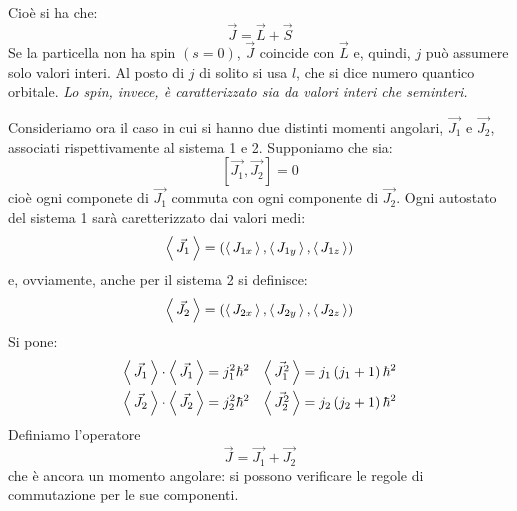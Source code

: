Cioè si ha che: 
\begin{equation}
\vec{J} = \vec{L} + \vec{S}
\end{equation}
Se la particella non ha spin $\left( s = 0\right)$, $\vec{J}$ coincide con
$\vec{L}$ e, quindi, $j$ può assumere solo valori interi. Al posto di $j$ di
solito si usa $l$, che si dice numero quantico orbitale. \textit{Lo spin,
invece, è caratterizzato sia da valori interi che seminteri.}

Consideriamo ora il caso in cui si hanno due distinti momenti angolari,
$\vec{J_{1}}$ e $\vec{J_{2}}$, associati rispettivamente al sistema 1 e 2.
Supponiamo che sia:
\begin{equation}
\left[\vec{J_{1}}, \vec{J_{2}} \right] = 0
\end{equation}
cioè ogni componete di $\vec{J_{1}}$ commuta con ogni componente di
$\vec{J_{2}}$. Ogni autostato del sistema 1 sarà caretterizzato dai valori 
medi:
\begin{equation}
\left\langle\, \vec{J_{1}} \,\right\rangle = \left( \left\langle\, J_{1x} \,\right\rangle, \left\langle\, J_{1y} \,\right\rangle, \left\langle\, J_{1z} \,\right\rangle \right)
\end{equation}
e, ovviamente, anche per il sistema 2 si definisce:
\begin{equation}
\left\langle\, \vec{J_{2}} \,\right\rangle = \left( \left\langle\, J_{2x} \,\right\rangle, \left\langle\, J_{2y} \,\right\rangle, \left\langle\, J_{2z} \,\right\rangle \right)
\end{equation}
Si pone:
\begin{align}
\left\langle\, \vec{J_{1}} \,\right\rangle \cdot \left\langle\, \vec{J_{1}} \,\right\rangle &= j_{1}^{2}\hbar ^2 & 
\left\langle\, \vec{J_{1}^{2}} \,\right\rangle &= j_{1}\left(j_{1} +1\right)\hbar ^{2} \\
\left\langle\, \vec{J_{2}} \,\right\rangle \cdot \left\langle\, \vec{J_{2}} \,\right\rangle &= j_{2}^{2}\hbar ^2 & 
\left\langle\, \vec{J_{2}^{2}} \,\right\rangle &= j_{2}\left(j_{2} +1\right)\hbar ^{2} \\  
\end{align}
Definiamo l'operatore 
\begin{equation}
\vec{J} = \vec{J_{1}} + \vec{J_{2}}
\end{equation}
che è ancora un momento angolare: si possono verificare le regole di
commutazione per le sue componenti.

